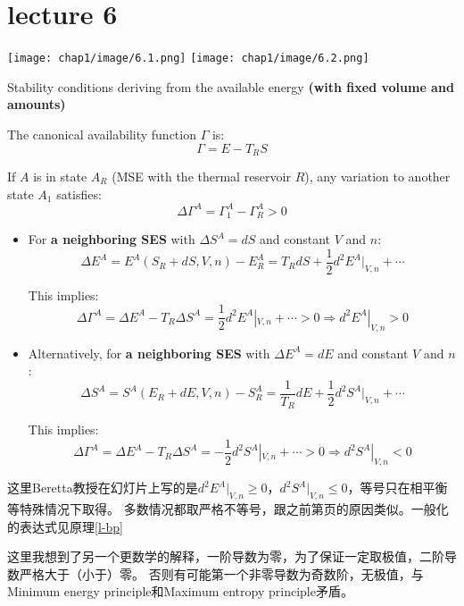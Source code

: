 \section{lecture 6}
\begin{minipage}{0.9\linewidth}
        \centering
        \texttt{[image: chap1/image/6.1.png]}
        \texttt{[image: chap1/image/6.2.png]}
\end{minipage}
\begin{thm}
    Stability conditions deriving from the available energy \textbf{(with fixed volume and amounts)}

    The canonical availability function \( \Gamma \) is:
\[
\Gamma = E - T_R S
\]

If \( A \) is in state \( A_R \) (MSE with the thermal reservoir \( R \)), any variation to another state \( A_1 \) satisfies:
\[
\Delta \Gamma^A = \Gamma_1^A - \Gamma_R^A > 0
\]
\begin{itemize}
    \item For \textbf{a neighboring SES} with \( \Delta S^A = dS \) and constant \( V \) and \( n \):
\[
\Delta E^A = E^A(S_R + dS, V, n) - E_R^A = T_R dS + \frac{1}{2}d^2E^A|_{V,n} + \cdots
\]

This implies:
\[
\Delta \Gamma^A = \Delta E^A - T_R \Delta S^A = \frac{1}{2}d^2E^A|_{V,n} + \cdots > 0 \Rightarrow d^2E^A|_{V,n} > 0
\]

\item Alternatively, for \textbf{a neighboring SES} with \( \Delta E^A = dE \) and constant \( V \) and \( n \):
\[
\Delta S^A = S^A(E_R + dE, V, n) - S_R^A = \frac{1}{T_R}dE + \frac{1}{2}d^2S^A|_{V,n} + \cdots
\]

This implies:
\[
\Delta \Gamma^A = \Delta E^A - T_R \Delta S^A = -\frac{1}{2}d^2S^A|_{V,n} + \cdots > 0 \Rightarrow d^2S^A|_{V,n} < 0
\]
\end{itemize}
\begin{zhu}
    这里Beretta教授在幻灯片上写的是\(d^2E^A|_{V,n} \geq 0\)，\(d^2S^A|_{V,n} \leq 0\)，等号只在相平衡等特殊情况下取得。
    多数情况都取严格不等号，跟之前第\pageref{<>}页的原因类似。一般化的表达式见原理\ref{l-bp}
    
    这里我想到了另一个更数学的解释，一阶导数为零，为了保证一定取极值，二阶导数严格大于（小于）零。
    否则有可能第一个非零导数为奇数阶，无极值，与
    Minimum energy principle和Maximum entropy principle矛盾。
\end{zhu}
\end{thm}
